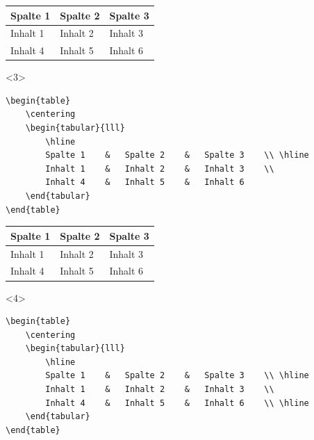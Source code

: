 \begin{frame}[fragile]
\begin{onlyenv}
		\Ausgabe
		\begin{outputbox}
			\begin{table}
				\centering
				\begin{tabular}{lll}
					Spalte 1	&	Spalte 2	&	Spalte 3	\\ \hline
					Inhalt 1	&	Inhalt 2	&	Inhalt 3	\\
					Inhalt 4	&	Inhalt 5	&	Inhalt 6	
				\end{tabular}
			\end{table}
		\end{outputbox}
	\end{onlyenv}
	\begin{onlyenv}
		\Code
		\begin{lstlisting}
\begin{table}
	\centering
	\begin{tabular}{lll}
		\hline
		Spalte 1	&	Spalte 2	&	Spalte 3	\\ \hline
		Inhalt 1	&	Inhalt 2	&	Inhalt 3	\\
		Inhalt 4	&	Inhalt 5	&	Inhalt 6	
	\end{tabular}
\end{table}
		\end{lstlisting}
		\Ausgabe
		\begin{outputbox}
			\begin{table}
				\centering
				\begin{tabular}{lll}
					\hline
					Spalte 1	&	Spalte 2	&	Spalte 3	\\ \hline
					Inhalt 1	&	Inhalt 2	&	Inhalt 3	\\
					Inhalt 4	&	Inhalt 5	&	Inhalt 6	
				\end{tabular}
			\end{table}
		\end{outputbox}
	\end{onlyenv}
	\begin{onlyenv}
		\Code
		\begin{lstlisting}
\begin{table}
	\centering
	\begin{tabular}{lll}
		\hline
		Spalte 1	&	Spalte 2	&	Spalte 3	\\ \hline
		Inhalt 1	&	Inhalt 2	&	Inhalt 3	\\
		Inhalt 4	&	Inhalt 5	&	Inhalt 6	\\ \hline
	\end{tabular}
\end{table}
		\end{lstlisting}
		\Ausgabe
		\begin{outputbox}

\end{outputbox}
\end{onlyenv}
\end{frame}
